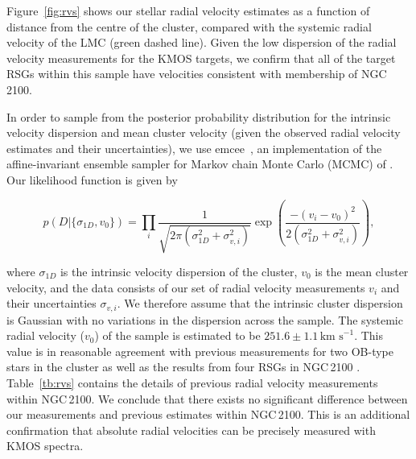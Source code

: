 \documentclass[useAMS,usenatbib]{mn2e}
\def\kms{$\mbox{km s}^{-1}$}
\begin{document}

Figure~\ref{fig:rvs} shows our stellar radial velocity estimates as a function of distance from the centre of the cluster, compared with the systemic radial velocity of the LMC (green dashed line).
Given the low dispersion of the radial velocity measurements for the KMOS targets, we confirm that all of the target RSGs within this sample have velocities consistent with membership of NGC\,2100.

In order to sample from the posterior probability distribution for the intrinsic velocity dispersion and mean cluster velocity (given the observed radial velocity estimates and their uncertainties), we use emcee~\citep{2013PASP..125..306F},
an implementation of the affine-invariant ensemble sampler for Markov chain Monte Carlo (MCMC) of \cite{2013CAMCS.5..65G}. Our likelihood function is given by

\begin{equation}
p(D|\{\sigma_{1D}, v_0\}) = \prod_i \frac{1}{\sqrt{2 \pi (\sigma_{1D}^2+ \sigma_{v, i}^2)}}  \exp{\left(\frac{-(v_i - v_0)^2}{2 (\sigma_{1D}^2+ \sigma_{v, i}^2)}\right)},
\label{eq:like}
\end{equation}

\noindent where $\sigma_{1D}$ is the intrinsic velocity dispersion of the cluster, $v_0$ is the mean cluster velocity, and the data consists of our set of radial velocity measurements $v_i$ and their uncertainties $\sigma_{v, i}$. We therefore assume that the intrinsic cluster dispersion is Gaussian with no variations in the dispersion across the sample.
The systemic radial velocity ($v_0$) of the sample is estimated to be $251.6\pm1.1$\,\kms.
This value is in reasonable agreement with previous measurements for two OB-type stars in the cluster
\citep{2015A&A...584A...5E} as well as the results from four RSGs in NGC\,2100
\citep[henceforth JT94; three of which were observed in the current study]{1994A&A...282..717J}.
Table~\ref{tb:rvs} contains the details of previous radial velocity measurements within NGC\,2100.
We conclude that there exists no significant difference between our measurements and previous estimates within NGC\,2100.
This is an additional confirmation that absolute radial velocities can be precisely measured with KMOS spectra.
\end{document}
